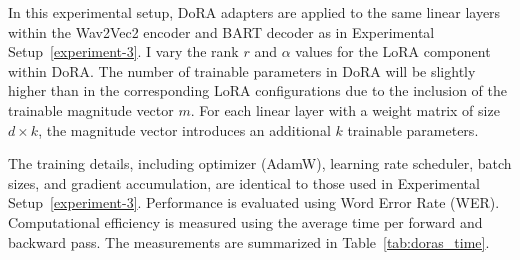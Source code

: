 In this experimental setup, DoRA adapters are applied to the same linear layers within the Wav2Vec2 encoder and BART decoder as in Experimental Setup~\ref{experiment-3}. I vary the rank \( r \) and \( \alpha \) values for the LoRA component within DoRA.  The number of trainable parameters in DoRA will be slightly higher than in the corresponding LoRA configurations due to the inclusion of the trainable magnitude vector \( m \). For each linear layer with a weight matrix of size \( d \times k \), the magnitude vector introduces an additional \( k \) trainable parameters.

The training details, including optimizer (AdamW), learning rate scheduler, batch sizes, and gradient accumulation, are identical to those used in Experimental Setup~\ref{experiment-3}.  Performance is evaluated using Word Error Rate (WER). Computational efficiency is measured using the average time per forward and backward pass. The measurements are summarized in Table~\ref{tab:doras_time}.

